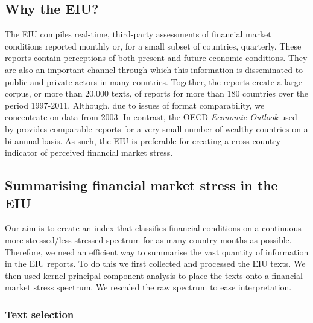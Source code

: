 \documentclass[]{article}
\begin{document}
\subsection{Why the EIU?}\label{why-the-eiu}

The EIU compiles real-time, third-party assessments of financial market conditions reported monthly or, for a small subset of countries, quarterly. These reports contain perceptions of both present and future economic conditions. They are also an important channel through which this information is disseminated to public and private actors in many countries. Together, the reports create a large corpus, or more than 20,000 texts, of reports for more than 180 countries over the period 1997-2011. Although, due to issues of format comparability, we concentrate on data from 2003. In contrast, the OECD \emph{Economic Outlook} used by \cite{Romer2015} provides comparable reports for a very small number of wealthy countries on a bi-annual basis. As such, the EIU is preferable for creating a cross-country indicator of perceived financial market stress.

\subsection{Summarising financial market stress in the
EIU}\label{summarizing-financial-market-stress-in-the-eiu}

Our aim is to create an index that classifies financial conditions on a continuous more-stressed/less-stressed spectrum for as many country-months as possible. Therefore, we need an efficient way to summarise the vast quantity of information in the EIU reports. To do this we first collected and processed the EIU texts. We then used kernel principal component analysis to place the texts onto a financial market stress spectrum. We rescaled the raw spectrum to ease interpretation.

\subsubsection{Text selection}\label{text-selection}
\end{document}
